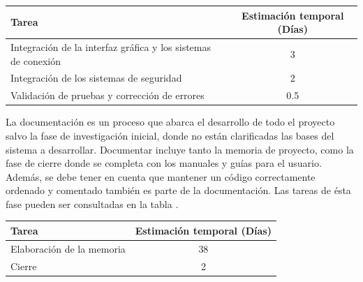 \documentclass[12pt]{article}
\begin{document}
            \begin{tabular}{|l|c|}
                \hline
                \textbf{Tarea}                                                              &   \textbf{Estimación temporal} (Días) \\           
                \hline
                Integración de la interfaz gráfica y los sistemas de conexión               &   3                                   \\
                Integración de los sistemas de seguridad                                    &   2                                   \\
                Validación de pruebas y corrección de errores                               &   0.5                                 \\
                \hline
            \end{tabular}

            La documentación es un proceso que abarca el desarrollo de todo el proyecto salvo la fase de investigación inicial, donde no están clarificadas las bases del sistema a desarrollar. Documentar incluye tanto la memoria de proyecto, como la fase de cierre donde se completa con los manuales y guías para el usuario. Además, se debe tener en cuenta que mantener un código correctamente ordenado y comentado también es parte de la documentación. Las tareas de ésta fase pueden ser consultadas en la tabla .

            \begin{tabular}{|l|c|}
                \hline
                \textbf{Tarea}                                                              &   \textbf{Estimación temporal} (Días) \\         
                \hline
                Elaboración de la memoria                                                   &   38                                  \\
                Cierre                                                                      &   2                                   \\
                \hline
            \end{tabular}
\end{document}
